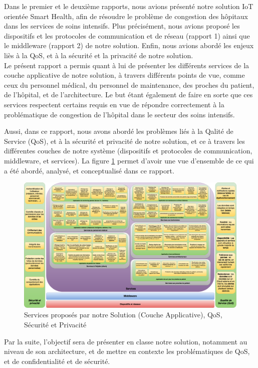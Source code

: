 Dans le premier et le deuxième rapports, nous avions présenté notre solution IoT orientée Smart Health, afin de résoudre le problème de congestion des hôpitaux dans les services de soins intensifs. Plus précisément, nous avions proposé les dispositifs et les protocoles de communication et de réseau (rapport 1) ainsi que le middleware (rapport 2) de notre solution. Enfin, nous avions abordé les enjeux liès à la QoS, et à la sécurité et la privacité de notre solution.
\\

Le présent rapport a permis quant à lui de présenter les différents services de la couche applicative de notre solution, à travers différents points de vue, comme ceux du personnel médical, du personnel de maintenance, des proches du patient, de l'hôpital, et de l'architecture. Le but étant également de faire en sorte que ces services respectent certains requis en vue de répondre correctement à la problématique de congestion de l'hôpital dans le secteur des soins intensifs. 

Aussi, dans ce rapport, nous avons abordé les problèmes liés à la Qalité de Service (QoS), et à la sécurité et privacité de notre solution, et ce à travers les différentes couches de notre système (dispositifs et protocoles de communication, middleware, et services). La figure \ref{final} permet d'avoir une vue d'ensemble de ce qui a été abordé, analysé, et conceptualisé dans ce rapport.
\\
\begin{figure}[h!]
	\hspace*{-4.2cm}
	\centering
	\includegraphics[width=1.7\textwidth]{final.png}
	\caption{Services proposés par notre Solution (Couche Applicative), QoS, Sécurité et Privacité}
	\label{final}
\end{figure}

Par la suite, l'objectif sera de présenter en classe notre solution, notamment au niveau de son architecture, et de mettre en contexte les problématiques de QoS, et de confidentialité et de sécurité.